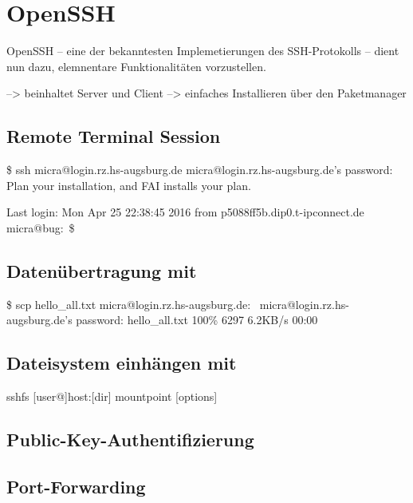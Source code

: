 \documentclass[ngerman,pdf]{wkcms}    %
\begin{document}
\section{OpenSSH}

OpenSSH -- eine der bekanntesten Implemetierungen des SSH-Protokolls -- dient nun dazu,
elemnentare Funktionalitäten vorzustellen. 

--> beinhaltet Server und Client
--> einfaches Installieren über den Paketmanager

\subsection{Remote Terminal Session}

\begin{program}
\$ ssh micra@login.rz.hs-augsburg.de
micra@login.rz.hs-augsburg.de's password:
Plan your installation, and FAI installs your plan.

Last login: Mon Apr 25 22:38:45 2016
from p5088ff5b.dip0.t-ipconnect.de
micra@bug:~\$

\end{program}

\subsection{Datenübertragung mit }

\begin{program}
\$ scp hello\_all.txt
micra@login.rz.hs-augsburg.de:~
micra@login.rz.hs-augsburg.de's password:
hello\_all.txt        100\% 6297     6.2KB/s   00:00
\end{program}

\subsection{Dateisystem einhängen mit }

\begin{program}
sshfs [user@]host:[dir] mountpoint [options]
\end{program}

\subsection{Public-Key-Authentifizierung}
\subsection{Port-Forwarding}
\end{document}
